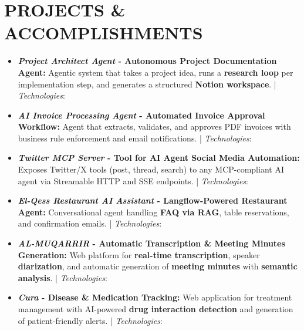 \documentclass[10pt, letterpaper]{article}
\newenvironment{highlights}{
    \begin{itemize}[
        topsep=0.05cm,
        partopsep=0pt,
        itemsep=0.05cm,
        parsep=0pt,
        leftmargin=0.5cm
    ]
}{
    \end{itemize}
}
\begin{document}
\section{PROJECTS \& ACCOMPLISHMENTS}

\begin{highlights}

	\item \textbf{\textit{Project Architect Agent} - Autonomous Project Documentation Agent:} Agentic system that takes a project idea, runs a \textbf{research loop} per implementation step, and generates a structured \textbf{Notion workspace}. | \textit{Technologies}:    

	\item \textbf{\textit{AI Invoice Processing Agent} - Automated Invoice Approval Workflow:} Agent that extracts, validates, and approves PDF invoices with business rule enforcement and email notifications. | \textit{Technologies}:    

	\item \textbf{\textit{Twitter MCP Server} - Tool for AI Agent Social Media Automation:} Exposes Twitter/X tools (post, thread, search) to any MCP-compliant AI agent via Streamable HTTP and SSE endpoints. | \textit{Technologies}:   

	\item \textbf{\textit{El-Qess Restaurant AI Assistant} - Langflow-Powered Restaurant Agent:} Conversational agent handling \textbf{FAQ via RAG}, table reservations, and confirmation emails. | \textit{Technologies}:     

	\item \textbf{\textit{AL-MUQARRIR} - Automatic Transcription \& Meeting Minutes Generation:}  Web platform for \textbf{real-time transcription}, speaker \textbf{diarization}, and automatic generation of \textbf{meeting minutes} with \textbf{semantic analysis}. | \textit{Technologies}:     

	\item \textbf{\textit{Cura} - Disease \& Medication Tracking:}  Web application for treatment management with AI-powered \textbf{drug interaction detection} and generation of patient-friendly alerts. | \textit{Technologies}:      


\end{highlights}
\end{document}
